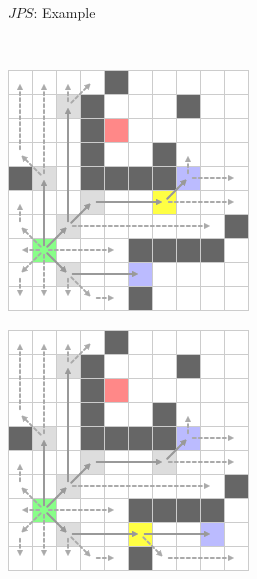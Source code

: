 \documentclass{presentation}
\begin{document}
\begin{frame}{$JPS$: Example}
\begin{minipage}{0.23\textwidth}
	\end{minipage}\\
	\vspace{2mm}
	\begin{minipage}{0.23\textwidth}
		\includegraphics[width=\textwidth]{figures/jps_geschnitten/8.png}
	\end{minipage}%
	\hfill%
	\begin{minipage}{0.23\textwidth}
		\includegraphics[width=\textwidth]{figures/jps_geschnitten/9.png}

\end{minipage}
\end{frame}
\end{document}
